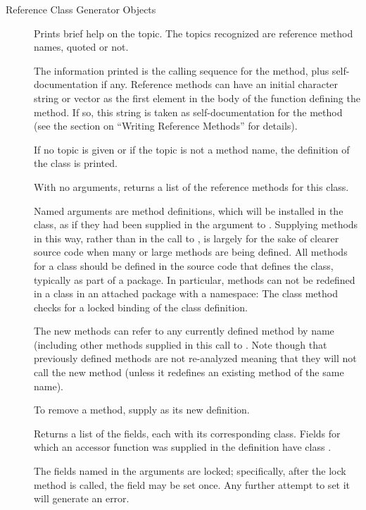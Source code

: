 \begin{Section}{Reference Class Generator Objects}
\begin{description}
\item[]  
Prints brief help on the topic.  The topics recognized
are reference method names, quoted or not.

The information printed is the calling sequence for the method, plus
self-documentation if any.
Reference methods can have an initial character string or vector as
the first element in the body of the function defining the method.
If so, this string is taken as self-documentation for the method (see
the section on ``Writing Reference Methods'' for details).

If no topic is given or if the topic is not a method name, the
definition of the class is printed.

\item[]  
With no arguments, returns a list of the reference methods for this
class.

Named arguments
are method definitions, which will be
installed in the class, as if they had been supplied in the
 argument to .
Supplying methods in this way, rather than in the call to
, is largely for the sake of clearer source code
when many or large methods are being defined.
All methods for a class should be defined in the source code that
defines the class, typically as part of a package.
In particular, methods can not be redefined in a class in an attached
package with a namespace: The class method checks for a locked
binding of the class definition.


The new methods can refer to any currently defined method by name
(including other methods supplied in this call to
. 
Note though that previously defined methods are not re-analyzed
meaning that they will not call the new method (unless it redefines an
existing method of the same name).

To remove a method, supply  as its new definition.


\item[]  
Returns a list of the fields, each with its corresponding class.
Fields for which an accessor function was supplied in the definition
have class .


\item[]  
The fields named in the arguments are locked; specifically, after the
lock method is called, the field may be set once.  Any further attempt
to set it will generate an error.


\end{description}
\end{Section}

